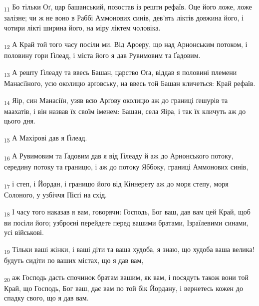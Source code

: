\begin{tcolorbox}
\textsubscript{11} Бо тільки Оґ, цар башанський, позостав із решти рефаїв. Оце його ложе, ложе залізне; чи ж не воно в Раббі Аммонових синів, дев'ять ліктів довжина його, і чотири лікті ширина його, на міру ліктем чоловіка.
\end{tcolorbox}
\begin{tcolorbox}
\textsubscript{12} А Край той того часу посіли ми. Від Ароеру, що над Арнонським потоком, і половину гори Ґілеад, і міста його я дав Рувимовим та Ґадовим.
\end{tcolorbox}
\begin{tcolorbox}
\textsubscript{13} А решту Ґілеаду та ввесь Башан, царство Оґа, віддав я половині племени Манасіїного, усю околицю арґовську, на ввесь той Башан кличеться: Край рефаїв.
\end{tcolorbox}
\begin{tcolorbox}
\textsubscript{14} Яір, син Манасіїн, узяв всю Арґову околицю аж до границі ґешурів та маахатів, і він назвав їх своїм іменем: Башан, села Яіра, і так їх кличуть аж до цього дня.
\end{tcolorbox}
\begin{tcolorbox}
\textsubscript{15} А Махірові дав я Ґілеад.
\end{tcolorbox}
\begin{tcolorbox}
\textsubscript{16} А Рувимовим та Ґадовим дав я від Ґілеаду й аж до Арнонського потоку, середину потоку та границю, і аж до потоку Яббоку, границі Аммонових синів,
\end{tcolorbox}
\begin{tcolorbox}
\textsubscript{17} і степ, і Йордан, і границю його від Кіннерету аж до моря степу, моря Солоного, у узбіччя Пісґі на схід.
\end{tcolorbox}
\begin{tcolorbox}
\textsubscript{18} І часу того наказав я вам, говорячи: Господь, Бог ваш, дав вам цей Край, щоб ви посіли його; узброєні перейдете перед вашими братами, Ізраїлевими синами, усі військові.
\end{tcolorbox}
\begin{tcolorbox}
\textsubscript{19} Тільки ваші жінки, і ваші діти та ваша худоба, я знаю, що худоба ваша велика! будуть сидіти по ваших містах, що я дав вам,
\end{tcolorbox}
\begin{tcolorbox}
\textsubscript{20} аж Господь дасть спочинок братам вашим, як вам, і посядуть також вони той Край, що Господь, Бог ваш, дає вам по той бік Йордану, і вернетесь кожен до спадку свого, що я дав вам.
\end{tcolorbox}
